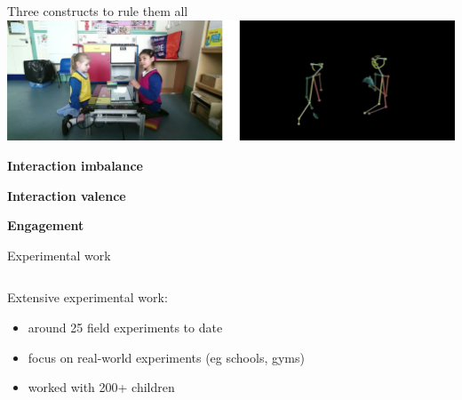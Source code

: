 \documentclass[xcolor=table]{beamer}
\begin{document}
\begin{frame}{Three constructs to rule them all}
        \centering
        \includegraphics[width=0.9\linewidth]{kinematics_social_dynamics/clips.jpg}

    \textbf{Interaction imbalance}
    
    \textbf{Interaction valence}
    
    \textbf{Engagement}

\end{frame}

%
%
%
%
%



{
\begin{frame}{Experimental work}

    \begin{columns}
        \begin{column}{0.4\linewidth}

    Extensive experimental work:

    \begin{itemize}
        \item around 25 field experiments to date
        \item focus on real-world experiments (eg schools, gyms) 
        \item worked with 200+ children
    \end{itemize}

    \end{column}
        \begin{column}{0.6\linewidth}
    \end{column}
    \end{columns}
\end{frame}
}
\end{document}

